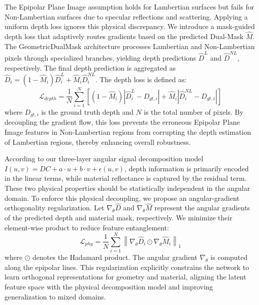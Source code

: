 \documentclass[lettersize,journal]{IEEEtran}
\begin{document}
The Epipolar Plane Image assumption holds for Lambertian surfaces but fails for Non-Lambertian surfaces due to specular reflections and scattering. Applying a uniform depth loss ignores this physical discrepancy. We introduce a mask-guided depth loss that adaptively routes gradients based on the predicted Dual-Mask $\hat{M}$. The GeometricDualMask architecture processes Lambertian and Non-Lambertian pixels through specialized branches, yielding depth predictions $\hat{D}^L$ and $\hat{D}^{NL}$, respectively. The final depth prediction is aggregated as $\hat{D}_i = (1 - \hat{M}_i)\hat{D}^L_i + \hat{M}_i\hat{D}^{NL}_i$. The depth loss is defined as:
\begin{equation}
\mathcal{L}_{depth} = \frac{1}{N} \sum_{i=1}^{N} \left[ (1 - \hat{M}_i) \left| \hat{D}^L_i - D_{gt, i} \right| + \hat{M}_i \left| \hat{D}^{NL}_i - D_{gt, i} \right| \right]
\label{eq:ch3_25}
\end{equation}
where $D_{gt, i}$ is the ground truth depth and $N$ is the total number of pixels. By decoupling the gradient flow, this loss prevents the erroneous Epipolar Plane Image features in Non-Lambertian regions from corrupting the depth estimation of Lambertian regions, thereby enhancing overall robustness.

According to our three-layer angular signal decomposition model $I(u,v) = DC + a\cdot u + b\cdot v + \epsilon(u,v)$, depth information is primarily encoded in the linear terms, while material reflectance is captured by the residual term. These two physical properties should be statistically independent in the angular domain. To enforce this physical decoupling, we propose an angular-gradient orthogonality regularization. Let $\nabla_{\theta} \hat{D}$ and $\nabla_{\theta} \hat{M}$ represent the angular gradients of the predicted depth and material mask, respectively. We minimize their element-wise product to reduce feature entanglement:
\begin{equation}
\mathcal{L}_{phy} = \frac{1}{N} \sum_{i=1}^{N} \left\| \nabla_{\theta} \hat{D}_i \odot \nabla_{\theta} \hat{M}_i \right\|_1
\label{eq:ch3_26}
\end{equation}
where $\odot$ denotes the Hadamard product. The angular gradient $\nabla_{\theta}$ is computed along the epipolar lines. This regularization explicitly constrains the network to learn orthogonal representations for geometry and material, aligning the latent feature space with the physical decomposition model and improving generalization to mixed domains.
\end{document}
